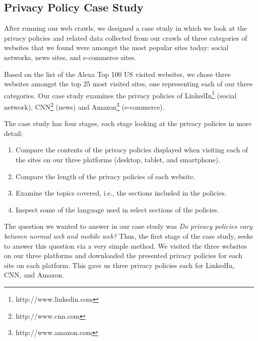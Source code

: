 \documentclass{acm_proc_article-sp}
\begin{document}
\newpage
\subsection{Privacy Policy Case Study}
After running our web crawls, we designed a case study in which we look at the privacy policies and related data collected from our crawls of three categories of websites that we found were amongst the most popular sites today: social networks, news sites, and e-commerce sites. 

Based on the list of the Alexa Top 100 US visited websites, we chose three websites amongst the top 25 most visited sites, one representing each of our three categories. Our case study examines the privacy policies of LinkedIn\footnote{http://www.linkedin.com} (social network), CNN\footnote{http://www.cnn.com} (news) and Amazon\footnote{http://www.amazon.com} (e-commerce).

The case study has four stages, each stage looking at the privacy policies in more detail:
\begin{enumerate}
\item Compare the contents of the privacy policies displayed when visiting each of the sites on our three platforms (desktop, tablet, and smartphone).
\item Compare the length of the privacy policies of each website.
\item Examine the topics covered, i.e., the sections included in the policies.
\item Inspect some of the language used in select sections of the policies.
\end{enumerate}

The question we wanted to answer in our case study was \emph{Do privacy policies vary between normal web and mobile web?} Thus, the first stage of the case study, seeks to answer this question via a very simple method. We visited the three websites on our three platforms and downloaded the presented privacy policies for each site on each platform. This gave us three privacy policies each for LinkedIn, CNN, and Amazon. 
\end{document}
